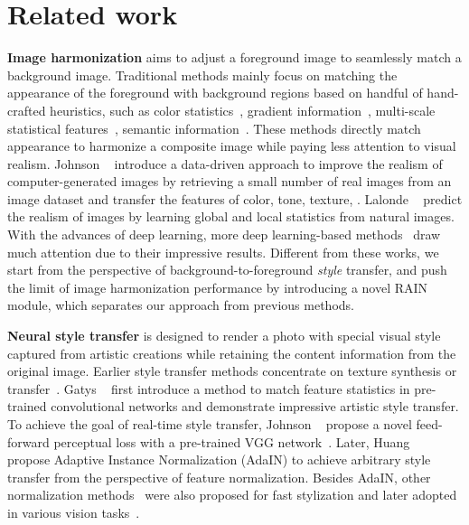 \documentclass[final]{cvpr}
\begin{document}
\section{Related work}

\noindent
\textbf{Image harmonization} aims to adjust a foreground image to seamlessly match a background image. Traditional methods mainly focus on matching the appearance of the foreground with background regions based on handful of hand-crafted heuristics, such as color statistics~\cite{reinhard2001color,pitie2007linear,xue2012understanding}, gradient information~\cite{jia2006drag,perez2003poisson,tao2013error}, multi-scale statistical features~\cite{sunkavalli2010multi}, semantic information~\cite{tsai2017deep,tsai2016sky}. These methods directly match appearance to harmonize a composite image while paying less attention to visual realism. Johnson \etal~\cite{johnson2010cg2real} introduce a data-driven approach to improve the realism of computer-generated images by retrieving a small number of real images from an image dataset and transfer the features of color, tone, texture, \etc. Lalonde \etal~\cite{lalonde2007using} predict the realism of images by learning global and local statistics from natural images. With the advances of deep learning, more deep learning-based methods~\cite{cun2020improving,cong2020dovenet,tsai2017deep,zhu2015learning} draw much attention due to their impressive results. Different from these works, we start from the perspective of background-to-foreground \emph{style} transfer, and push the limit of image harmonization performance by introducing a novel RAIN module, which separates our approach from previous methods. 


\medskip
\noindent
\textbf{Neural style transfer} is designed to render a photo with special visual style captured from artistic creations while retaining the content information from the original image. Earlier style transfer methods concentrate on texture synthesis or transfer~\cite{efros2001image,elad2017style,li2016precomputed,ulyanov2016texture}. Gatys \etal~\cite{gatys2016image} first introduce a method to match feature statistics in pre-trained convolutional networks and demonstrate impressive artistic style transfer. To achieve the goal of real-time style transfer, Johnson \etal~\cite{johnson2016perceptual} propose a novel feed-forward perceptual loss with a pre-trained VGG network~\cite{simonyan2014very}. Later, Huang \etal~\cite{huang2017arbitrary} propose Adaptive Instance Normalization (AdaIN) to achieve arbitrary style transfer from the perspective of feature normalization. Besides AdaIN, other normalization methods~\cite{dumoulin2016learned,ulyanov2016instance} were also proposed for fast stylization and later adopted in various vision tasks~\cite{huang2018multimodal,li2020advancing,liu2019few,zakharov2019few,xue2020realistic}. 
\end{document}
